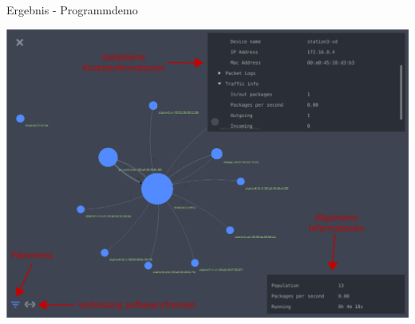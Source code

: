 \begin{frame}{Ergebnis - Programmdemo}
    \begin{center}
        \includegraphics[width=0.8\linewidth]{images/demo}
    \end{center}
\end{frame} 